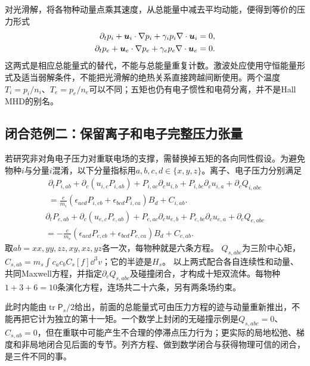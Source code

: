 \documentclass[UTF8,a4paper,11pt,openany,fontset=fandol]{ctexbook}
\begin{document}
对光滑解，将各物种动量点乘其速度，从总能量中减去平均动能，便得到等价的压力形式
\begin{align}
 \partial_t p_i+\bm{u}_i\cdot\nabla p_i+\gamma_i p_i\nabla\cdot\bm{u}_i&=0,\\
 \partial_t p_e+\bm{u}_e\cdot\nabla p_e+\gamma_e p_e\nabla\cdot\bm{u}_e&=0.
 \label{eq:twofluid-adiabatic}
\end{align}
这两式是相应总能量式的替代，不能与总能量重复计数。激波处应使用守恒能量形式及适当弱解条件，不能把光滑解的绝热关系直接跨越间断使用。两个温度
$T_i=p_i/n_i$、$T_e=p_e/n_e$可以不同；五矩也仍有电子惯性和电荷分离，并不是Hall MHD的别名。

\subsection{闭合范例二：保留离子和电子完整压力张量}
\label{sec:full-ten-moment}
若研究非对角电子压力对重联电场的支撑，需替换掉五矩的各向同性假设。为避免物种$i$与分量$i$混淆，以下分量指标用$a,b,c,d\in\{x,y,z\}$。离子、电子压力分别满足
\begin{multline}
 \partial_tP_{i,ab}+\partial_c(u_{i,c}P_{i,ab})
 +P_{i,ac}\partial_cu_{i,b}+P_{i,bc}\partial_cu_{i,a}
 +\partial_cQ_{i,abc}\\
 =
 \frac e{m_i}(\epsilon_{acd}P_{i,cb}+\epsilon_{bcd}P_{i,ca})B_d
 +C_{i,ab}.
 \label{eq:ion-pressure-full}
\end{multline}
\begin{multline}
 \partial_tP_{e,ab}+\partial_c(u_{e,c}P_{e,ab})
 +P_{e,ac}\partial_cu_{e,b}+P_{e,bc}\partial_cu_{e,a}
 +\partial_cQ_{e,abc}\\
 =
 -\frac e{m_e}(\epsilon_{acd}P_{e,cb}+\epsilon_{bcd}P_{e,ca})B_d
 +C_{e,ab}.
 \label{eq:electron-pressure-full}
\end{multline}
取$ab=xx,yy,zz,xy,xz,yz$各一次，每物种就是六条方程。
$Q_{s,abc}$为三阶中心矩，
$C_{s,ab}=m_s\int c_ac_bC_s[f]\dd^3v$；它的半迹是$H_s$。
以上两式配合各自连续性和动量、共同Maxwell方程，并指定$\partial_cQ_{s,abc}$及碰撞闭合，才构成十矩双流体。每物种$1+3+6=10$条演化方程，连场共二十六条，另有两条场约束。

此时内能由$\operatorname{tr}\mathsf P_s/2$给出，前面的总能量式可由压力方程的迹与动量重新推出，不能再把它计为独立的第十一矩。一个数学上封闭的无碰撞示例是$Q_{s,abc}=0$、$C_{s,ab}=0$，但在重联中可能产生不合理的停滞点压力行为；更实际的局地松弛、梯度和非局地闭合见后面的专节。列齐方程、做到数学闭合与获得物理可信的闭合，是三件不同的事。\citep{Wang2015,Ng2020}

\end{document}
